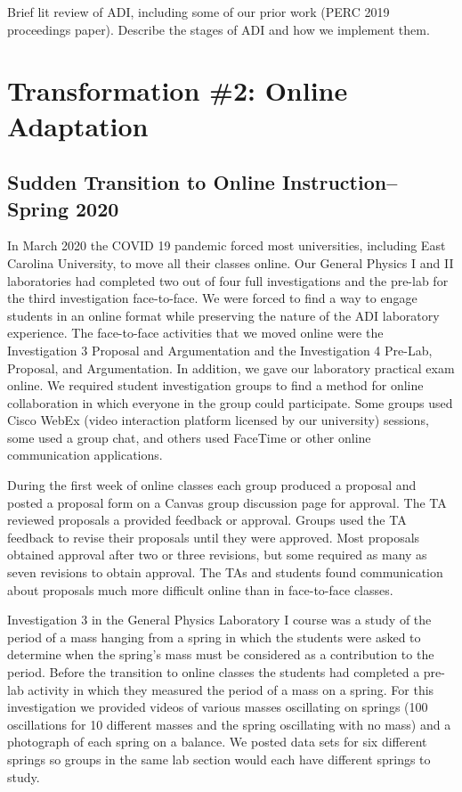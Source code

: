 \documentclass[aip, numerical, preprint]{revtex4-2}
\begin{document}
Brief lit review of ADI, including some of our prior work (PERC 2019 proceedings paper).
Describe the stages of ADI and how we implement them.

\section{Transformation \#2: Online Adaptation}
\subsection{Sudden Transition to Online Instruction--Spring 2020}

In March 2020 the COVID 19 pandemic forced most universities, including East Carolina
University, to move all their classes online. Our General Physics I and II laboratories had
completed two out of four full investigations and the pre-lab for the third investigation
face-to-face. We were forced to find a way to engage students in an online format while
preserving the nature of the ADI laboratory experience. The face-to-face activities that we
moved online were the Investigation 3 Proposal and Argumentation and the Investigation 4
Pre-Lab, Proposal, and Argumentation. In addition, we gave our laboratory practical exam
online. We required student investigation groups to find a method for online collaboration in
which everyone in the group could participate. Some groups used Cisco WebEx (video interaction
platform licensed by our university) sessions, some used a group chat, and others used FaceTime
or other online communication applications.

During the first week of online classes each group produced a proposal and posted a proposal
form on a Canvas group discussion page for approval. The TA reviewed proposals a provided
feedback or approval. Groups used the TA feedback to revise their proposals until they were
approved. Most proposals obtained approval after two or three revisions, but some required as
many as seven revisions to obtain approval. The TAs and students found communication about
proposals much more difficult online than in face-to-face classes.

Investigation 3 in the General Physics Laboratory I course was a study of the period of a mass
hanging from a spring in which the students were asked to determine when the spring's mass must
be considered as a contribution to the period. Before the transition to online classes the
students had completed a pre-lab activity in which they measured the period of a mass on a
spring. For this investigation we provided videos of various masses oscillating on springs (100
oscillations for 10 different masses and the spring oscillating with no mass) and a photograph
of each spring on a balance. We posted data sets for six different springs so groups in the
same lab section would each have different springs to study.
\end{document}
